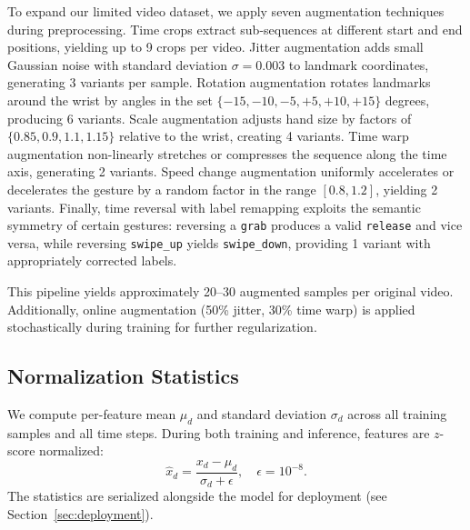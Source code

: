 To expand our limited video dataset, we apply seven augmentation
techniques during preprocessing. Time crops extract sub-sequences at different start and end positions, yielding up to 9 crops per video. Jitter augmentation adds small Gaussian noise with standard deviation $\sigma = 0.003$ to landmark coordinates, generating 3 variants per sample. Rotation augmentation rotates landmarks around the wrist by angles in the set $\{-15, -10, -5, +5, +10, +15\}$ degrees, producing 6 variants. Scale augmentation adjusts hand size by factors of $\{0.85, 0.9, 1.1, 1.15\}$ relative to the wrist, creating 4 variants. Time warp augmentation non-linearly stretches or compresses the sequence along the time axis, generating 2 variants. Speed change augmentation uniformly accelerates or decelerates the gesture by a random factor in the range $[0.8, 1.2]$, yielding 2 variants. Finally, time reversal with label remapping exploits the semantic symmetry of certain gestures: reversing a \texttt{grab} produces a valid \texttt{release} and vice versa, while reversing \texttt{swipe\_up} yields \texttt{swipe\_down}, providing 1 variant with appropriately corrected labels.

This pipeline yields approximately 20--30 augmented samples per
original video. Additionally, online augmentation (50\% jitter,
30\% time warp) is applied stochastically during training for
further regularization.

\subsection{Normalization Statistics}

We compute per-feature mean $\mu_d$ and standard deviation $\sigma_d$
across all training samples and all time steps. During both training
and inference, features are $z$-score normalized:
\begin{equation}
  \hat{x}_d = \frac{x_d - \mu_d}{\sigma_d + \epsilon}, \quad
  \epsilon = 10^{-8}.
  \label{eq:normalize}
\end{equation}
The statistics are serialized alongside the model for deployment
(see Section~\ref{sec:deployment}).
